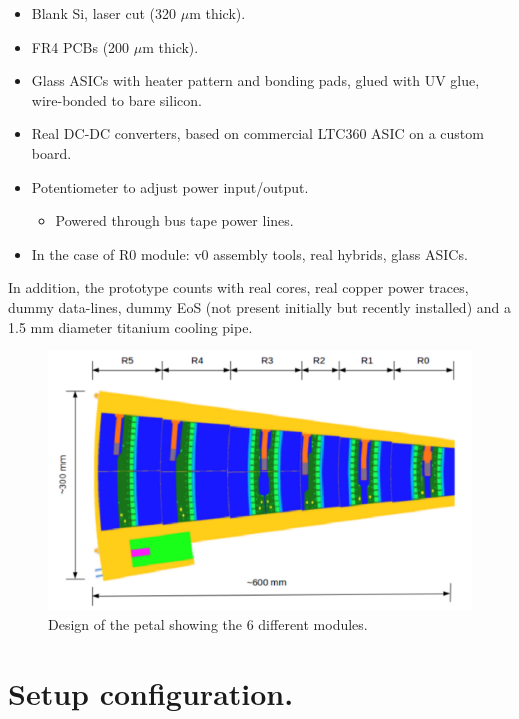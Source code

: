 		\begin{itemize}
			\renewcommand{\labelitemi}{$\diamond$}
			\item Blank Si, laser cut (320 $\mu$m thick).
			\item FR4 PCBs (200 $\mu$m thick).
			\item Glass ASICs with heater pattern and bonding pads, glued with UV glue, wire-bonded to bare silicon.
			\item Real DC-DC converters, based on commercial LTC360 ASIC on a custom board.
			\item Potentiometer to adjust power input/output.
			\begin{itemize}
			\renewcommand{\labelitemi}{$\bullet$}
				\item Powered through bus tape power lines.
			\end{itemize}
			\item In the case of R0 module: v0 assembly tools, real hybrids, glass ASICs.
		\end{itemize}
		
		In addition, the prototype counts with real cores, real copper power traces, dummy data-lines, dummy EoS (not present initially but recently installed) and a 1.5 mm diameter titanium cooling pipe.
		
		\begin{figure}[ht!]
			\centering
			\captionsetup{justification=centering,margin=2cm}
			\includegraphics[scale=0.35]{Figures/Chapter02/PetalDesign.pdf}
			\caption{Design of the petal showing the 6 different modules.}\label{fig2.5}
		\end{figure}
		
	\section{Setup configuration.}\label{section2.4}
	
